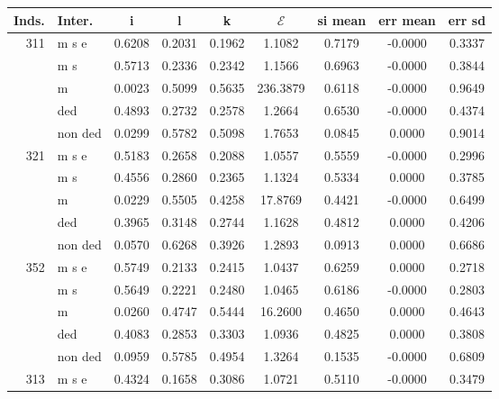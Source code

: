 \documentclass{standalone}
\begin{document}
\begin{tabular}{rlccccccc} \toprule
Inds.& Inter.& i  & l  & k  & $\mathcal{E}$  & si mean  & err mean  & err sd  \\  \hline
311& m s e &    0.6208 &    0.2031 &    0.1962 &    1.1082 &    0.7179 &   -0.0000 &    0.3337 \\  
& m s &    0.5713 &    0.2336 &    0.2342 &    1.1566 &    0.6963 &   -0.0000 &    0.3844 \\  
& m &    0.0023 &    0.5099 &    0.5635 &  236.3879 &    0.6118 &   -0.0000 &    0.9649 \\  
& ded &    0.4893 &    0.2732 &    0.2578 &    1.2664 &    0.6530 &   -0.0000 &    0.4374 \\  
& non ded &    0.0299 &    0.5782 &    0.5098 &    1.7653 &    0.0845 &    0.0000 &    0.9014 \\  \hline
321& m s e &    0.5183 &    0.2658 &    0.2088 &    1.0557 &    0.5559 &   -0.0000 &    0.2996 \\  
& m s &    0.4556 &    0.2860 &    0.2365 &    1.1324 &    0.5334 &    0.0000 &    0.3785 \\  
& m &    0.0229 &    0.5505 &    0.4258 &   17.8769 &    0.4421 &   -0.0000 &    0.6499 \\  
& ded &    0.3965 &    0.3148 &    0.2744 &    1.1628 &    0.4812 &    0.0000 &    0.4206 \\  
& non ded &    0.0570 &    0.6268 &    0.3926 &    1.2893 &    0.0913 &    0.0000 &    0.6686 \\  \hline
352& m s e &    0.5749 &    0.2133 &    0.2415 &    1.0437 &    0.6259 &    0.0000 &    0.2718 \\  
& m s &    0.5649 &    0.2221 &    0.2480 &    1.0465 &    0.6186 &   -0.0000 &    0.2803 \\  
& m &    0.0260 &    0.4747 &    0.5444 &   16.2600 &    0.4650 &    0.0000 &    0.4643 \\  
& ded &    0.4083 &    0.2853 &    0.3303 &    1.0936 &    0.4825 &    0.0000 &    0.3808 \\  
& non ded &    0.0959 &    0.5785 &    0.4954 &    1.3264 &    0.1535 &   -0.0000 &    0.6809 \\  \hline
313& m s e &    0.4324 &    0.1658 &    0.3086 &    1.0721 &    0.5110 &   -0.0000 &    0.3479 \\  

\end{tabular}
\end{document}

